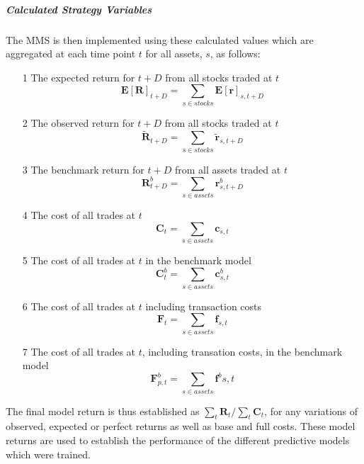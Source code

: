 \documentclass[a4paper,11pt,oneside]{article}
\theoremstyle{plain}
\theoremstyle{definition}
\begin{document}
\hfill\break

\subparagraph{Calculated Strategy Variables} The MMS  is then implemented using these calculated values which are aggregated at each time point $t$ for all assets, $s$, as follows:

\begin{itemize}
	\item [1] The expected return for $t+D$ from all stocks traded at $t$
					\begin{equation}
					\mathbf{E[R]}_{{t+D}} = \sum_{s \in stocks} \mathbf{E[r]}_{s, {t+D}}
					\end{equation}
	\item [2] The observed return for $t+D$ from all stocks traded at $t$
					\begin{equation}
					\mathbf{\tilde{R}}_{{t+D}} = \sum_{s \in stocks} \mathbf{\tilde{r}}_{s, {t+D}}
					\end{equation}
	\item [3] The benchmark return for $t+D$ from all assets traded at $t$
					\begin{equation}
					\mathbf{R}^b_{{t+D}} = \sum_{s \in assets} \mathbf{r}^b_{s, {t+D}}
					\end{equation}
	\item [4] The cost of all trades at $t$
					\begin{equation}
					\mathbf{C}_t = \sum_{s \in assets} \mathbf{c}_{s,t}
					\end{equation}
	\item [5] The cost of all trades at $t$ in the benchmark model
					\begin{equation}
					\mathbf{C}^b_{t} = \sum_{s \in assets} \mathbf{c}^b_{s ,t}
					\end{equation}
	\item [6] The cost of all trades at $t$ including transaction costs
					\begin{equation}
					\mathbf{F}_t = \sum_{s \in assets} \mathbf{f}_{s,t}
					\end{equation}
	\item [7] The cost of all trades at $t$, including transation costs, in the benchmark model	
					\begin{equation}
					\mathbf{F}^b_{p,t} = \sum_{s \in assets} \mathbf{f}^b{s,t}
					\end{equation}	
\end{itemize}
\hfill\break
The final model return is thus established as $\sum_t{\mathbf{R}_t} / \sum_t{\mathbf{C}_t} $, for any variations of observed, expected or perfect returns as well as base and full costs. These model returns are used to establish the performance of the different predictive models which were trained.\newline
\hfill\break
\end{document}
